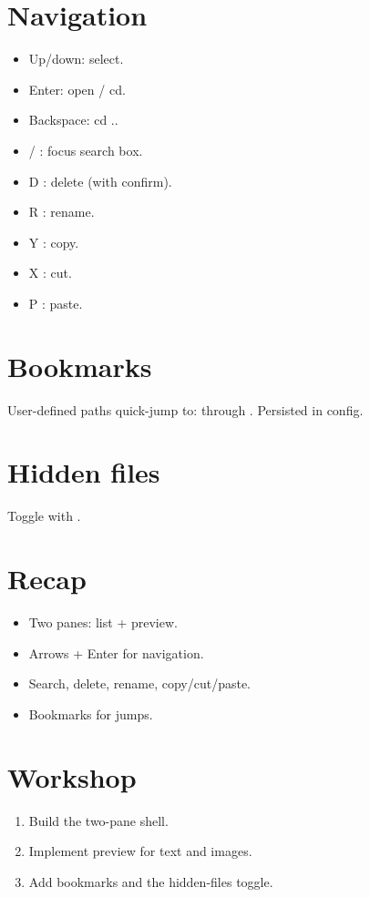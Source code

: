 \section{Navigation}

\begin{itemize}[leftmargin=*]
  \item Up/down: select.
  \item Enter: open / cd.
  \item Backspace: cd ..
  \item / : focus search box.
  \item D : delete (with confirm).
  \item R : rename.
  \item Y : copy.
  \item X : cut.
  \item P : paste.
\end{itemize}

\section{Bookmarks}

User-defined paths quick-jump to:  through
. Persisted in config.

\section{Hidden files}

Toggle with .

\section{Recap}

\begin{recap}
\begin{itemize}[leftmargin=*]
  \item Two panes: list + preview.
  \item Arrows + Enter for navigation.
  \item Search, delete, rename, copy/cut/paste.
  \item Bookmarks for jumps.
\end{itemize}
\end{recap}

\section*{Workshop}

\begin{enumerate}[leftmargin=*]
  \item Build the two-pane shell.
  \item Implement preview for text and images.
  \item Add bookmarks and the hidden-files toggle.
\end{enumerate}
